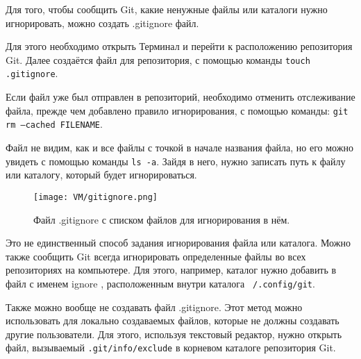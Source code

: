 Для того, чтобы сообщить Git, какие ненужные файлы или каталоги нужно игнорировать, можно создать .gitignore файл.

Для этого необходимо открыть Терминал и перейти к расположению репозитория Git. Далее создаётся файл для репозитория, с помощью команды \texttt{touch .gitignore}.

Если файл уже был отправлен в репозиторий, необходимо отменить отслеживание файла, прежде чем добавлено правило игнорирования, с помощью команды: \texttt{git rm --cached FILENAME}.

Файл не видим, как и все файлы с точкой в начале названия файла, но его можно увидеть с помощью команды \texttt{ls -a}. Зайдя в него, нужно записать путь к файлу или каталогу, который будет игнорироваться.

\begin{figure}[h]
		\centering
		\texttt{[image: VM/gitignore.png]}
\caption{Файл .gitignore с списком файлов для игнорирования в нём.}
\label{ris:image}
\end{figure}

Это не единственный способ задания игнорирования файла или каталога. Можно также сообщить Git всегда игнорировать определенные файлы во всех репозиториях на компьютере. Для этого, например, каталог нужно добавить в файл с именем ignore , расположенным внутри каталога \texttt{~/.config/git}.

Также можно вообще не создавать файл .gitignore. Этот метод можно использовать для локально создаваемых файлов, которые не должны создавать другие пользователи. Для этого, используя текстовый редактор, нужно открыть файл, вызываемый \texttt{.git/info/exclude} в корневом каталоге репозитория Git.